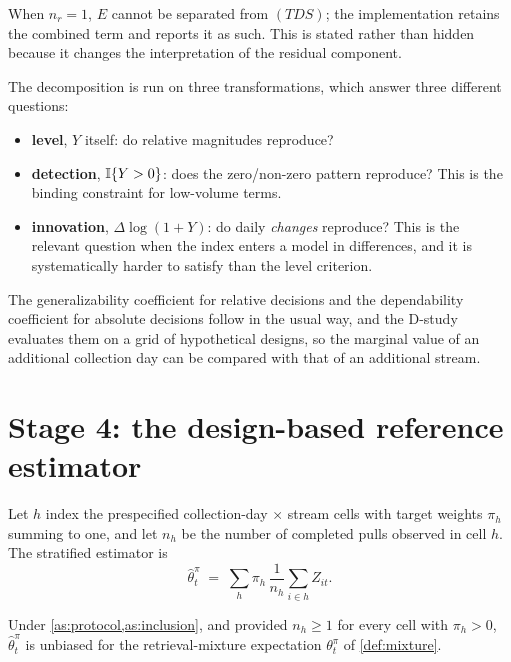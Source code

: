 \documentclass[12pt,a4paper,oneside]{article}
\begin{document}
\begin{remark}
When $n_r = 1$, $E$ cannot be separated from $(TDS)$; the implementation retains
the combined term and reports it as such. This is stated rather than hidden
because it changes the interpretation of the residual component.
\end{remark}

The decomposition is run on three transformations, which answer three different
questions:
\begin{itemize}
\item \textbf{level}, $Y$ itself: do relative magnitudes reproduce?
\item \textbf{detection}, $\mathbb{I}\!\left\{Y > 0\right\}$: does the zero/non-zero pattern
reproduce? This is the binding constraint for low-volume terms.
\item \textbf{innovation}, $\Delta\log(1+Y)$: do daily \emph{changes} reproduce?
This is the relevant question when the index enters a model in differences,
and it is systematically harder to satisfy than the level criterion.
\end{itemize}

The generalizability coefficient for relative decisions and the dependability
coefficient for absolute decisions follow in the usual way, and the D-study
evaluates them on a grid of hypothetical designs, so the marginal value of an
additional collection day can be compared with that of an additional stream.

\section{Stage 4: the design-based reference estimator}\label{sec:designest}

Let $h$ index the prespecified collection-day $\times$ stream cells with target
weights $\pi_h$ summing to one, and let $n_h$ be the number of completed pulls
observed in cell $h$. The stratified estimator is
\begin{equation}
\hat{\theta}^{\pi}_t \;=\; \sum_{h} \pi_h \,
\frac{1}{n_h}\sum_{i \in h} Z_{it}.
\label{eq:design-est}
\end{equation}

\begin{proposition}\label{prop:design}
Under \cref{as:protocol,as:inclusion}, and provided $n_h \ge 1$ for every cell
with $\pi_h > 0$, $\hat{\theta}^{\pi}_t$ is unbiased for the retrieval-mixture
expectation $\theta^{\pi}_t$ of \cref{def:mixture}.
\end{proposition}
\end{document}
